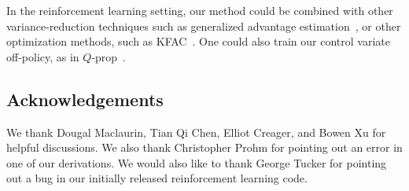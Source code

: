 \documentclass{article}
\begin{document}
 In the reinforcement learning setting, our method could be combined with other variance-reduction techniques such as generalized advantage estimation~\citep{kimura2000analysis, schulman2015high}, or other optimization methods, such as KFAC~\citep{wu2017scalable}.
One could also train our control variate off-policy, as in $Q$-prop~\citep{gu2016q}.

\subsection*{Acknowledgements}  %
We thank Dougal Maclaurin, Tian Qi Chen, Elliot Creager, and Bowen Xu for helpful discussions.
We also thank Christopher Prohm for pointing out an error in one of our derivations. We would also like to thank George Tucker for pointing out a bug in our initially released reinforcement learning code. 









\end{document}
